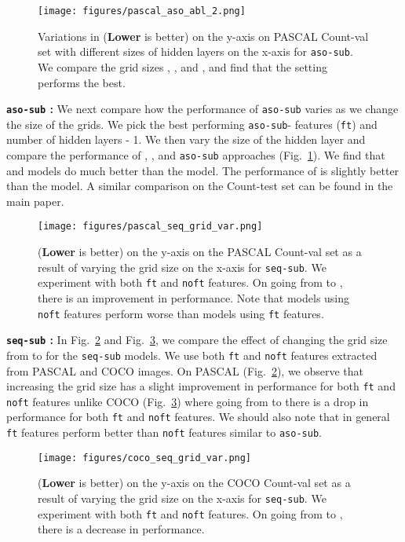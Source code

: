 \documentclass[10pt,twocolumn,letterpaper]{article}
\newcommand{\sub}{\texttt{aso-sub}\xspace}
\newcommand{\seq}{\texttt{seq-sub}\xspace}
\newcommand{\reffig}[1]{Fig.~\ref{#1}}
\begin{document}
\begin{figure}
\texttt{[image: figures/pascal\_aso\_abl\_2.png]}
\caption{Variations in  (\textbf{Lower} is better) on the y-axis on PASCAL Count-val set with different sizes of hidden layers on the x-axis for \sub. We compare the grid sizes , , and , and find that the  setting performs the best.}
\label{fig:pascal_asosubfine}
\end{figure}



\textbf{\sub{} : }
We next compare how the performance of \sub varies as we change the size of the grids. We pick the best performing \sub-\texttt{} features (\texttt{ft}) and number of hidden layers - 1. We then vary the size of the hidden layer and compare the performance of , , and  \sub approaches (\reffig{fig:pascal_asosubfine}). We find that  and  models do much better than the  model. The performance of  is slightly better than the  model. A similar comparison on the Count-test set can be found in the main paper.


\begin{figure}
\texttt{[image: figures/pascal\_seq\_grid\_var.png]}
\caption{ (\textbf{Lower} is better) on the y-axis on the PASCAL Count-val set as a result of varying the grid size on the x-axis for \seq. We experiment with both \texttt{ft} and \texttt{noft} features. On going from  to , there is an improvement in performance. Note that models using \texttt{noft} features perform worse than models using \texttt{ft} features.}
\label{fig:pascal_seq}
\end{figure}


\textbf{\seq{} : }
In \reffig{fig:pascal_seq} and \reffig{fig:coco_seq}, we compare the effect of changing the grid size from  to  for the \seq models. We use both \texttt{ft} and \texttt{noft} features extracted from PASCAL and COCO images. On PASCAL (\reffig{fig:pascal_seq}), we observe that increasing the grid size has a slight improvement in performance for both \texttt{ft} and \texttt{noft} features unlike COCO (\reffig{fig:coco_seq}) where going from  to  there is a drop in performance for both \texttt{ft} and \texttt{noft} features. We should also note that in general \texttt{ft} features perform better than \texttt{noft} features similar to \sub.
\begin{figure}
\texttt{[image: figures/coco\_seq\_grid\_var.png]}
\caption{ (\textbf{Lower} is better) on the y-axis on the COCO Count-val set as a result of varying the grid size on the x-axis for \seq. We experiment with both \texttt{ft} and \texttt{noft} features. On going from  to , there is a decrease in performance.}
\label{fig:coco_seq}
\end{figure}
\end{document}
